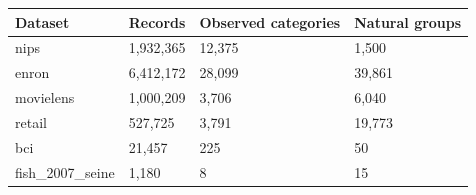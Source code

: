 \begin{tabular}{llll}
\toprule
Dataset & Records & Observed categories & Natural groups \\
\midrule
nips & 1,932,365 & 12,375 & 1,500 \\
enron & 6,412,172 & 28,099 & 39,861 \\
movielens & 1,000,209 & 3,706 & 6,040 \\
retail & 527,725 & 3,791 & 19,773 \\
bci & 21,457 & 225 & 50 \\
fish\_2007\_seine & 1,180 & 8 & 15 \\
\bottomrule
\end{tabular}
